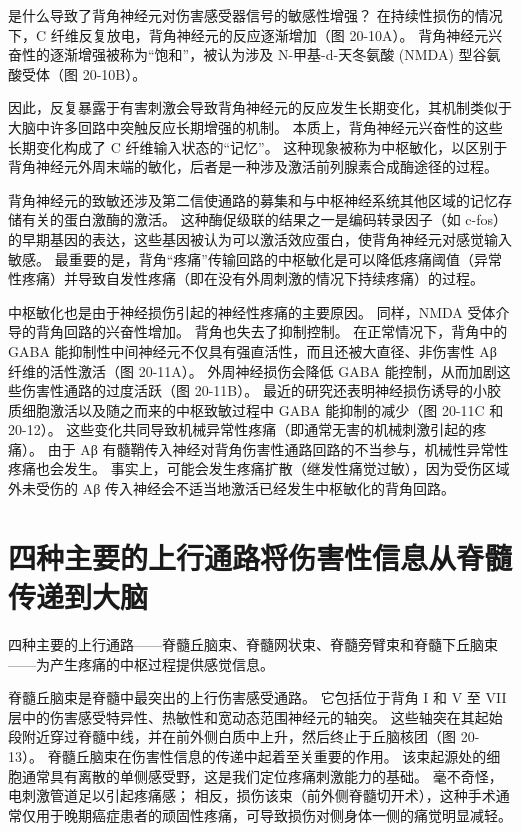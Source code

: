 是什么导致了背角神经元对伤害感受器信号的敏感性增强？ 在持续性损伤的情况下，C 纤维反复放电，背角神经元的反应逐渐增加（图 20-10A）。 背角神经元兴奋性的逐渐增强被称为“饱和”，被认为涉及 N-甲基-d-天冬氨酸 (NMDA) 型谷氨酸受体（图 20-10B）。

因此，反复暴露于有害刺激会导致背角神经元的反应发生长期变化，其机制类似于大脑中许多回路中突触反应长期增强的机制。 本质上，背角神经元兴奋性的这些长期变化构成了 C 纤维输入状态的“记忆”。 这种现象被称为中枢敏化，以区别于背角神经元外周末端的敏化，后者是一种涉及激活前列腺素合成酶途径的过程。

背角神经元的致敏还涉及第二信使通路的募集和与中枢神经系统其他区域的记忆存储有关的蛋白激酶的激活。 这种酶促级联的结果之一是编码转录因子（如 c-fos）的早期基因的表达，这些基因被认为可以激活效应蛋白，使背角神经元对感觉输入敏感。 最重要的是，背角“疼痛”传输回路的中枢敏化是可以降低疼痛阈值（异常性疼痛）并导致自发性疼痛（即在没有外周刺激的情况下持续疼痛）的过程。

中枢敏化也是由于神经损伤引起的神经性疼痛的主要原因。 同样，NMDA 受体介导的背角回路的兴奋性增加。 背角也失去了抑制控制。 在正常情况下，背角中的 GABA 能抑制性中间神经元不仅具有强直活性，而且还被大直径、非伤害性 Aβ 纤维的活性激活（图 20-11A）。 外周神经损伤会降低 GABA 能控制，从而加剧这些伤害性通路的过度活跃（图 20-11B）。 最近的研究还表明神经损伤诱导的小胶质细胞激活以及随之而来的中枢致敏过程中 GABA 能抑制的减少（图 20-11C 和 20-12）。 这些变化共同导致机械异常性疼痛（即通常无害的机械刺激引起的疼痛）。 由于 Aβ 有髓鞘传入神经对背角伤害性通路回路的不当参与，机械性异常性疼痛也会发生。 事实上，可能会发生疼痛扩散（继发性痛觉过敏），因为受伤区域外未受伤的 Aβ 传入神经会不适当地激活已经发生中枢敏化的背角回路。


\section{四种主要的上行通路将伤害性信息从脊髓传递到大脑}
四种主要的上行通路——脊髓丘脑束、脊髓网状束、脊髓旁臂束和脊髓下丘脑束——为产生疼痛的中枢过程提供感觉信息。

脊髓丘脑束是脊髓中最突出的上行伤害感受通路。 它包括位于背角 I 和 V 至 VII 层中的伤害感受特异性、热敏性和宽动态范围神经元的轴突。 这些轴突在其起始段附近穿过脊髓中线，并在前外侧白质中上升，然后终止于丘脑核团（图 20-13）。 脊髓丘脑束在伤害性信息的传递中起着至关重要的作用。 该束起源处的细胞通常具有离散的单侧感受野，这是我们定位疼痛刺激能力的基础。 毫不奇怪，电刺激管道足以引起疼痛感； 相反，损伤该束（前外侧脊髓切开术），这种手术通常仅用于晚期癌症患者的顽固性疼痛，可导致损伤对侧身体一侧的痛觉明显减轻。

